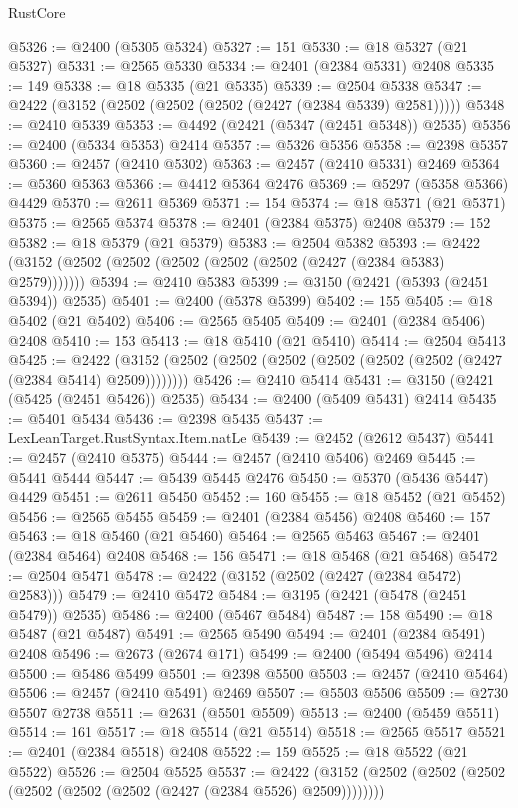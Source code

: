 \begin{lexlean}{RustCore}
\begin{coremodule}
@5326 := @2400 (@5305 @5324)
@5327 := 151
@5330 := @18 @5327 (@21 @5327)
@5331 := @2565 @5330
@5334 := @2401 (@2384 @5331) @2408
@5335 := 149
@5338 := @18 @5335 (@21 @5335)
@5339 := @2504 @5338
@5347 := @2422 (@3152 (@2502 (@2502 (@2502 (@2427 (@2384 @5339) @2581)))))
@5348 := @2410 @5339
@5353 := @4492 (@2421 (@5347 (@2451 @5348)) @2535)
@5356 := @2400 (@5334 @5353) @2414
@5357 := @5326 @5356
@5358 := @2398 @5357
@5360 := @2457 (@2410 @5302)
@5363 := @2457 (@2410 @5331) @2469
@5364 := @5360 @5363
@5366 := @4412 @5364 @2476
@5369 := @5297 (@5358 @5366) @4429
@5370 := @2611 @5369
@5371 := 154
@5374 := @18 @5371 (@21 @5371)
@5375 := @2565 @5374
@5378 := @2401 (@2384 @5375) @2408
@5379 := 152
@5382 := @18 @5379 (@21 @5379)
@5383 := @2504 @5382
@5393 := @2422 (@3152 (@2502 (@2502 (@2502 (@2502 (@2502 (@2427 (@2384 @5383) @2579)))))))
@5394 := @2410 @5383
@5399 := @3150 (@2421 (@5393 (@2451 @5394)) @2535)
@5401 := @2400 (@5378 @5399)
@5402 := 155
@5405 := @18 @5402 (@21 @5402)
@5406 := @2565 @5405
@5409 := @2401 (@2384 @5406) @2408
@5410 := 153
@5413 := @18 @5410 (@21 @5410)
@5414 := @2504 @5413
@5425 := @2422 (@3152 (@2502 (@2502 (@2502 (@2502 (@2502 (@2502 (@2427 (@2384 @5414) @2509))))))))
@5426 := @2410 @5414
@5431 := @3150 (@2421 (@5425 (@2451 @5426)) @2535)
@5434 := @2400 (@5409 @5431) @2414
@5435 := @5401 @5434
@5436 := @2398 @5435
@5437 := LexLeanTarget.RustSyntax.Item.natLe
@5439 := @2452 (@2612 @5437)
@5441 := @2457 (@2410 @5375)
@5444 := @2457 (@2410 @5406) @2469
@5445 := @5441 @5444
@5447 := @5439 @5445 @2476
@5450 := @5370 (@5436 @5447) @4429
@5451 := @2611 @5450
@5452 := 160
@5455 := @18 @5452 (@21 @5452)
@5456 := @2565 @5455
@5459 := @2401 (@2384 @5456) @2408
@5460 := 157
@5463 := @18 @5460 (@21 @5460)
@5464 := @2565 @5463
@5467 := @2401 (@2384 @5464) @2408
@5468 := 156
@5471 := @18 @5468 (@21 @5468)
@5472 := @2504 @5471
@5478 := @2422 (@3152 (@2502 (@2427 (@2384 @5472) @2583)))
@5479 := @2410 @5472
@5484 := @3195 (@2421 (@5478 (@2451 @5479)) @2535)
@5486 := @2400 (@5467 @5484)
@5487 := 158
@5490 := @18 @5487 (@21 @5487)
@5491 := @2565 @5490
@5494 := @2401 (@2384 @5491) @2408
@5496 := @2673 (@2674 @171)
@5499 := @2400 (@5494 @5496) @2414
@5500 := @5486 @5499
@5501 := @2398 @5500
@5503 := @2457 (@2410 @5464)
@5506 := @2457 (@2410 @5491) @2469
@5507 := @5503 @5506
@5509 := @2730 @5507 @2738
@5511 := @2631 (@5501 @5509)
@5513 := @2400 (@5459 @5511)
@5514 := 161
@5517 := @18 @5514 (@21 @5514)
@5518 := @2565 @5517
@5521 := @2401 (@2384 @5518) @2408
@5522 := 159
@5525 := @18 @5522 (@21 @5522)
@5526 := @2504 @5525
@5537 := @2422 (@3152 (@2502 (@2502 (@2502 (@2502 (@2502 (@2502 (@2427 (@2384 @5526) @2509))))))))

\end{coremodule}
\end{lexlean}
